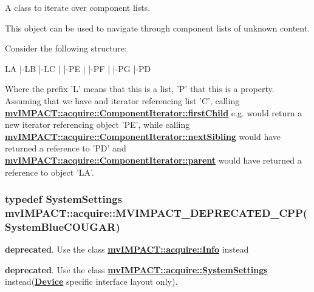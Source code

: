 A class to iterate over component lists. 

This object can be used to navigate through component lists of unknown content.

Consider the following structure\+:


\begin{DoxyCode}
LA
|-LB
|-LC
|  |-PE
|  |-PF
|  |-PG
|-PD
\end{DoxyCode}


Where the prefix 'L' means that this is a list, 'P' that this is a property. Assuming that we have and iterator referencing list 'C', calling {\bfseries \hyperlink{classmv_i_m_p_a_c_t_1_1acquire_1_1_component_aaf5cfd9177e1d002b501a85df253096b}{mv\+I\+M\+P\+A\+C\+T\+::acquire\+::\+Component\+Iterator\+::first\+Child}} e.\+g. would return a new iterator referencing object 'P\+E', while calling {\bfseries \hyperlink{classmv_i_m_p_a_c_t_1_1acquire_1_1_component_aeccbdbf047d18e8ac0d20fc874c185a7}{mv\+I\+M\+P\+A\+C\+T\+::acquire\+::\+Component\+Iterator\+::next\+Sibling}} would have returned a reference to 'P\+D' and {\bfseries \hyperlink{classmv_i_m_p_a_c_t_1_1acquire_1_1_component_a07b183818aad835e54066780413de330}{mv\+I\+M\+P\+A\+C\+T\+::acquire\+::\+Component\+Iterator\+::parent}} would have returned a reference to object 'L\+A'. \hypertarget{group___common_interface_ga3066c4f348d9374a48618855a5797dc9}{
\subsubsection[{M\+V\+I\+M\+P\+A\+C\+T\+\_\+\+D\+E\+P\+R\+E\+C\+A\+T\+E\+D\+\_\+\+C\+P\+P}]{\setlength{\rightskip}{0pt plus 5cm}typedef {\bf System\+Settings} mv\+I\+M\+P\+A\+C\+T\+::acquire\+::\+M\+V\+I\+M\+P\+A\+C\+T\+\_\+\+D\+E\+P\+R\+E\+C\+A\+T\+E\+D\+\_\+\+C\+P\+P(System\+Blue\+C\+O\+U\+G\+A\+R)}}\label{group___common_interface_ga3066c4f348d9374a48618855a5797dc9}


{\bfseries deprecated}. Use the class {\bfseries \hyperlink{classmv_i_m_p_a_c_t_1_1acquire_1_1_info}{mv\+I\+M\+P\+A\+C\+T\+::acquire\+::\+Info}} instead 

{\bfseries deprecated}. Use the class {\bfseries \hyperlink{classmv_i_m_p_a_c_t_1_1acquire_1_1_system_settings}{mv\+I\+M\+P\+A\+C\+T\+::acquire\+::\+System\+Settings}} instead({\bfseries \hyperlink{classmv_i_m_p_a_c_t_1_1acquire_1_1_device}{Device}} specific interface layout only).

